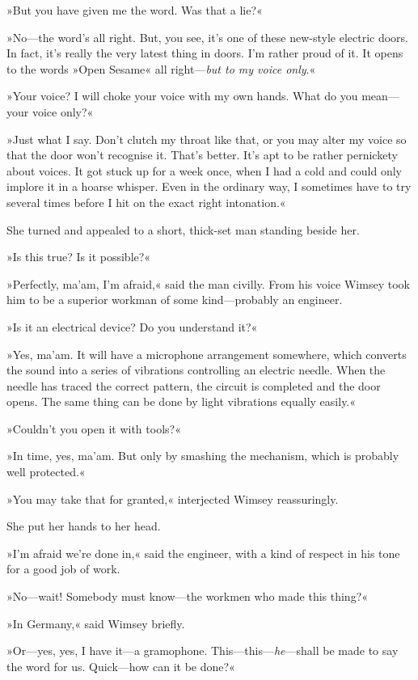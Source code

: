 »But you have given me the word. Was that a lie?«

»No—the word's all right. But, you see, it's one of these new-style electric doors. In fact, it's really the very latest thing in doors. I'm rather proud of it. It opens to the words »Open Sesame« all right—\textit{but to my voice only}.«

»Your voice? I will choke your voice with my own hands. What do you mean—your voice only?«

»Just what I say. Don't clutch my throat like that, or you may alter my voice so that the door won't recognise it. That's better. It's apt to be rather pernickety about voices. It got stuck up for a week once, when I had a cold and could only implore it in a hoarse whisper. Even in the ordinary way, I sometimes have to try several times before I hit on the exact right intonation.«

She turned and appealed to a short, thick-set man standing beside her.

»Is this true? Is it possible?«

»Perfectly, ma'am, I'm afraid,« said the man civilly. From his voice Wimsey took him to be a superior workman of some kind—probably an engineer.

»Is it an electrical device? Do you understand it?«

»Yes, ma'am. It will have a microphone arrangement somewhere, which converts the sound into a series of vibrations controlling an electric needle. When the needle has traced the correct pattern, the circuit is completed and the door opens. The same thing can be done by light vibrations equally easily.«

»Couldn't you open it with tools?«

»In time, yes, ma'am. But only by smashing the mechanism, which is probably well protected.«

»You may take that for granted,« interjected Wimsey reassuringly.

She put her hands to her head.

»I'm afraid we're done in,« said the engineer, with a kind of respect in his tone for a good job of work.

»No—wait! Somebody must know—the workmen who made this thing?«

»In Germany,« said Wimsey briefly.

»Or—yes, yes, I have it—a gramophone. This—this—\textit{he}—shall be made to say the word for us. Quick—how can it be done?«

